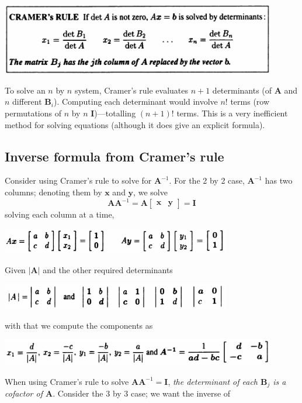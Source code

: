 \documentclass{report}
\begin{document}
\begin{center}
\includegraphics[width=12cm]{104}
\end{center}
To solve an $n$ by $n$ system, Cramer's rule evaluates $n+1$ determinants (of $\bm A$ and $n$ different $\bm B_i$). Computing each determinant
would involve $n!$ terms (row permutations of $n$ by $n$ $\bm I$)---totalling $(n+1)!$ terms. This is a very inefficient method for solving equations (although it does give
an explicit formula).
\newpage
\subsection{Inverse formula from Cramer's rule}
Consider using Cramer's rule to solve for $\bm A^{-1}$. For the 2 by 2 case, $\bm A^{-1}$ has two columns; denoting them by $\bm x$ and $\bm y$, we solve 
\begin{equation*}
\bm{AA}^{-1}=\bm{A}\left[\begin{array}{cc}\bm x&\bm y\end{array}\right]=\bm I
\end{equation*}
solving each column at a time, 
\begin{center}
\includegraphics[width=10cm]{105}
\end{center}
Given $|\bm A|$ and the other required determinants
\begin{center}
\includegraphics[width=10cm]{106}
\end{center}
with that we compute the components as
\begin{center}
\includegraphics[width=12cm]{107}
\end{center}
When using Cramer's rule to solve $\bm{AA}^{-1}=\bm I$, \textit{the determinant of each $\bm B_j$ is a cofactor of $\bm A$}. Consider the 3 by 3 case; we want the inverse of 
\end{document}
